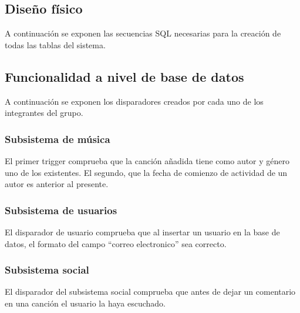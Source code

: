 \subsection{Diseño físico}

A continuación se exponen las secuencias SQL necesarias para la creación de todas las tablas del sistema.

 

\subsection{Funcionalidad a nivel de base de datos}

A continuación se exponen los disparadores creados por cada uno de los integrantes del grupo.

\subsubsection{Subsistema de música}

El primer trigger comprueba que la canción añadida tiene como autor y género uno de los existentes. El segundo, que la fecha de comienzo de actividad de un autor es anterior al presente.

 


\subsubsection{Subsistema de usuarios}

El disparador de usuario comprueba que al insertar un usuario en la base de datos, el formato del campo ``correo electronico'' sea correcto.
 

\subsubsection{Subsistema social}
El disparador del subsistema social comprueba que antes de dejar un comentario en una canción el usuario la haya escuchado.
 
